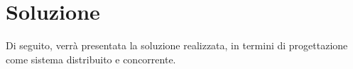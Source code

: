 \chapter{Soluzione}\label{chapter:solution}

Di seguito, verrà presentata la soluzione realizzata, in termini di progettazione come sistema distribuito e concorrente.





